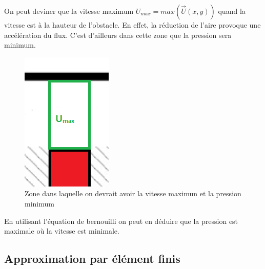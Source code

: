 \documentclass[a4paper,11pt]{report} %
\begin{document}
\begin{center}
\end{center}
\pagebreak
On peut deviner que la vitesse maximum $U_{max}=max(\overrightarrow{U}(x,y))$ quand la vitesse est à la hauteur de l'obstacle.
 En effet, la réduction de l'aire provoque une accélération du flux. C'est d'ailleurs dans cette zone que la pression sera minimum.
\begin{figure}[!h]
\centering
\hspace*{0mm}\vfill
\begin{center} \includegraphics{zonevitessemax.png} \end{center}
\vfill\hspace*{0mm}
\caption{Zone dans laquelle on devrait avoir la vitesse maximun et la pression minimum}
\label{Tux}
\end{figure}

En utilisant l'équation de bernouilli on peut en déduire que la pression est maximale où la vitesse est minimale.

\subsection{Approximation par élément finis}
\end{document}
